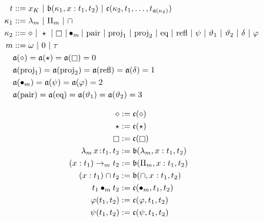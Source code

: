 
\begin{figure}
    \centering
    \begin{align*}
        t &::= x_K\ |\ \mathfrak{b}(\kappa_1, x : t_1, t_2)\ |\ \mathfrak{c}(\kappa_2, t_1, \ldots, t_{\mathfrak{a}(\kappa_2)}) \\
        \kappa_1 &::= \lambda_m\ |\ \Pi_m\ |\ \cap \\
        \kappa_2 &::=\diamond\ |\ \star\ |\ \kind\ | \bullet_m |\ \text{pair}\ |\ \text{proj}_1\ |\ \text{proj}_2\ |\ \text{eq}\ |\ \text{refl}\ |\ \psi\ |\ \vartheta_1\ |\ \vartheta_2\ |\ \delta\ |\ \varphi  \\
        m &::= \omega\ |\ 0\ |\ \tau \\
        &\mathfrak{a}(\diamond) = \mathfrak{a}(\star) = \mathfrak{a}(\kind) = 0 \\
        &\mathfrak{a}(\text{proj}_1) = \mathfrak{a}(\text{proj}_2) = \mathfrak{a}(\text{refl}) = \mathfrak{a}(\delta) = 1 \\
        &\mathfrak{a}(\bullet_m) = \mathfrak{a}(\psi) = \mathfrak{a}(\varphi) = 2 \\
        &\mathfrak{a}(\text{pair}) = \mathfrak{a}(\text{eq}) = \mathfrak{a}(\vartheta_1) = \mathfrak{a}(\vartheta_2) = 3
    \end{align*}
    \vspace{-.4in}
    \begin{minipage}{0.5\textwidth}
        \begin{align*}
            \diamond &:= \mathfrak{c}(\diamond) \\
            \star &:= \mathfrak{c}(\star) \\
            \kind &:= \mathfrak{c}(\kind) \\
            \abs{\lambda_m}{x}{t_1}{t_2} &:= \mathfrak{b}(\lambda_m, x : t_1, t_2) \\
            (x : t_1) \to_m t_2 &:= \mathfrak{b}(\Pi_m, x : t_1, t_2) \\
            (x : t_1) \cap t_2 &:= \mathfrak{b}(\cap, x : t_1, t_2) \\
            t_1 \bullet_m t_2 &:= \mathfrak{c}(\bullet_m, t_1, t_2) \\
            \varphi(t_1, t_2) &:= \mathfrak{c}(\varphi, t_1, t_2) \\
            \psi(t_1, t_2) &:= \mathfrak{c}(\psi, t_1, t_2)
        \end{align*}
    \end{minipage}%
    \begin{minipage}{0.5\textwidth}

\end{minipage}
\end{figure}
